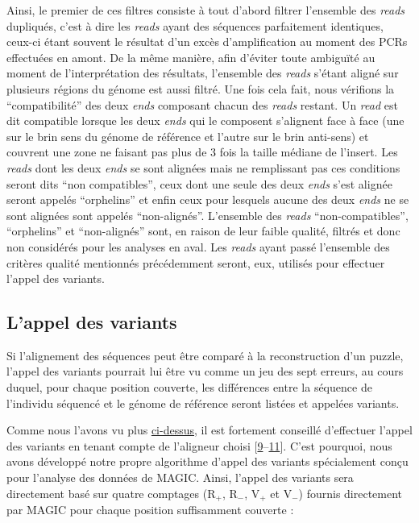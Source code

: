 \documentclass[12pt,a4paper,twoside]{ugathesis}
\begin{document}
Ainsi, le premier de ces filtres consiste à tout d'abord filtrer
l'ensemble des \emph{reads} dupliqués, c'est à dire les \emph{reads}
ayant des séquences parfaitement identiques, ceux-ci étant souvent le
résultat d'un excès d'amplification au moment des PCRs effectuées en
amont. De la même manière, afin d'éviter toute ambiguïté au moment de
l'interprétation des résultats, l'ensemble des \emph{reads} s'étant
aligné sur plusieurs régions du génome est aussi filtré. Une fois cela
fait, nous vérifions la ``compatibilité'' des deux \emph{ends} composant
chacun des \emph{reads} restant. Un \emph{read} est dit compatible
lorsque les deux \emph{ends} qui le composent s'alignent face à face
(une sur le brin sens du génome de référence et l'autre sur le brin
anti-sens) et couvrent une zone ne faisant pas plus de 3 fois la taille
médiane de l'insert. Les \emph{reads} dont les deux \emph{ends} se sont
alignées mais ne remplissant pas ces conditions seront dits ``non
compatibles'', ceux dont une seule des deux \emph{ends} s'est alignée
seront appelés ``orphelins'' et enfin ceux pour lesquels aucune des deux
\emph{ends} ne se sont alignées sont appelés ``non-alignés''. L'ensemble
des \emph{reads} ``non-compatibles'', ``orphelins'' et ``non-alignés''
sont, en raison de leur faible qualité, filtrés et donc non considérés
pour les analyses en aval. Les \emph{reads} ayant passé l'ensemble des
critères qualité mentionnés précédemment seront, eux, utilisés pour
effectuer l'appel des variants.

\newpage

\subsection{L'appel des variants}\label{lappel-des-variants}

Si l'alignement des séquences peut être comparé à la reconstruction d'un
puzzle, l'appel des variants pourrait lui être vu comme un jeu des sept
erreurs, au cours duquel, pour chaque position couverte, les différences
entre la séquence de l'individu séquencé et le génome de référence
seront listées et appelées variants.

Comme nous l'avons vu plus \protect\hyperlink{varcall}{ci-dessus}, il
est fortement conseillé d'effectuer l'appel des variants en tenant
compte de l'aligneur choisi
{[}\protect\hyperlink{ref-Nielsen2011}{9}--\protect\hyperlink{ref-Lunter2011}{11}{]}.
C'est pourquoi, nous avons développé notre propre algorithme d'appel des
variants spécialement conçu pour l'analyse des données de MAGIC. Ainsi,
l'appel des variants sera directement basé sur quatre comptages
(R\(_+\), R\(_-\), V\(_+\) et V\(_-\)) fournis directement par MAGIC
pour chaque position suffisamment couverte :
\end{document}

